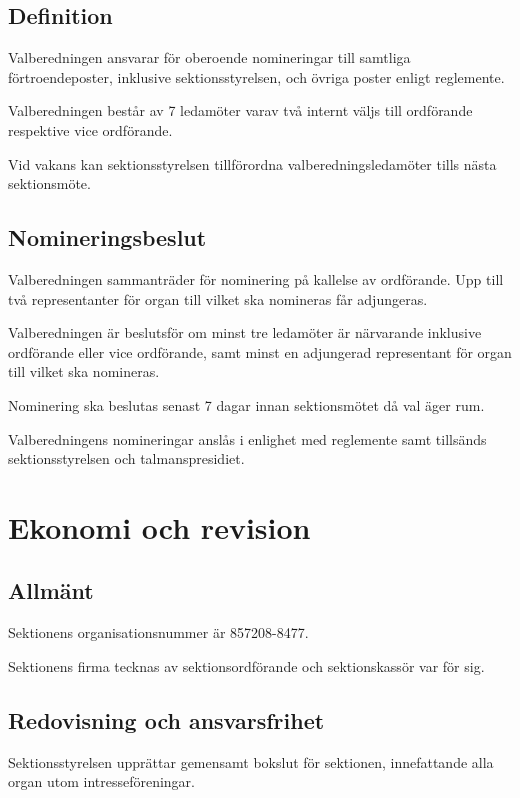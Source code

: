 \documentclass{styrdokument}
\begin{document}
\subsection{Definition}

\? Valberedningen ansvarar för oberoende nomineringar till samtliga förtroendeposter, inklusive sektionsstyrelsen, och övriga poster enligt reglemente.
  
\? Valberedningen består av 7 ledamöter varav två internt väljs till ordförande respektive vice ordförande.

\? Vid vakans kan sektionsstyrelsen tillförordna valberedningsledamöter tills nästa sektionsmöte.

\subsection{Nomineringsbeslut}

\? Valberedningen sammanträder för nominering på kallelse av ordförande.
Upp till två representanter för organ till vilket ska nomineras får adjungeras.

\? Valberedningen är beslutsför om minst tre ledamöter är närvarande inklusive ordförande eller vice ordförande, samt minst en adjungerad representant för organ till vilket ska nomineras.

\? Nominering ska beslutas senast 7 dagar innan sektionsmötet då val äger rum.

\? Valberedningens nomineringar anslås i enlighet med reglemente samt tillsänds sektionsstyrelsen och talmanspresidiet.

\section{Ekonomi och revision}
\subsection{Allmänt}

\? Sektionens organisationsnummer är 857208-8477.

\? Sektionens firma tecknas av sektionsordförande och sektionskassör var för
sig.

\subsection{Redovisning och ansvarsfrihet} \label{arsredovisning}

\? Sektionsstyrelsen upprättar gemensamt bokslut för sektionen, innefattande alla organ utom intresseföreningar.
\end{document}
